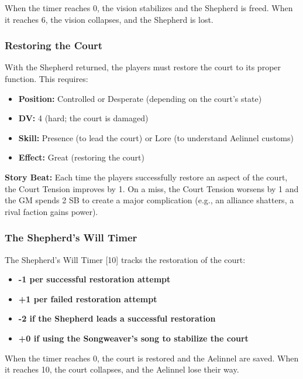 \documentclass{article}
\begin{document}
When the timer reaches 0, the vision stabilizes and the Shepherd is freed. When it reaches 6, the vision collapses, and the Shepherd is lost.

\subsubsection{Restoring the Court}

With the Shepherd returned, the players must restore the court to its proper function. This requires:

\begin{itemize}
    \item \textbf{Position:} Controlled or Desperate (depending on the court's state)
    \item \textbf{DV:} 4 (hard; the court is damaged)
    \item \textbf{Skill:} Presence (to lead the court) or Lore (to understand Aelinnel customs)
    \item \textbf{Effect:} Great (restoring the court)
\end{itemize}

\begin{storybox}
\textbf{Story Beat:} Each time the players successfully restore an aspect of the court, the Court Tension improves by 1. On a miss, the Court Tension worsens by 1 and the GM spends 2 SB to create a major complication (e.g., an alliance shatters, a rival faction gains power).
\end{storybox}

\subsubsection{The Shepherd's Will Timer }

The Shepherd's Will Timer [10] tracks the restoration of the court:

\begin{itemize}
    \item \textbf{-1 per successful restoration attempt}
    \item \textbf{+1 per failed restoration attempt}
    \item \textbf{-2 if the Shepherd leads a successful restoration}
    \item \textbf{+0 if using the Songweaver's song to stabilize the court}
\end{itemize}

When the timer reaches 0, the court is restored and the Aelinnel are saved. When it reaches 10, the court collapses, and the Aelinnel lose their way.
\end{document}
